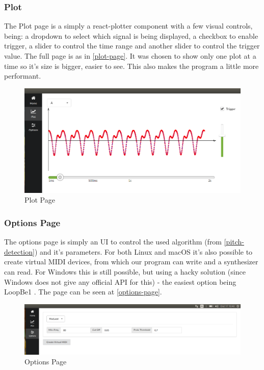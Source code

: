 \subsubsection{Plot}
The Plot page is a simply a react-plotter \cite{react-plotter} component with a few
visual controls, being: a dropdown to select which signal is being displayed,
a checkbox to enable trigger, a slider to control the time
range and another slider to control the trigger value. The full page is as in \autoref{plot-page}.
It was chosen to show only one plot at a time so it's size is bigger, easier to see.
This also makes the program a little more performant.
\begin{figure}[htb]
	\caption{Plot Page}
  \label{plot-page}
	\begin{center}
    \includegraphics[width=0.7\paperwidth]{images/snapshots/plot-trigger-A}
	\end{center}
\end{figure}

\subsubsection{Options Page}
The options page is simply an UI to control the used algorithm (from \autoref{pitch-detection})
and it's parameters. For both Linux and macOS it's also possible to create virtual
MIDI devices, from which our program can write and a synthesizer can read. For Windows
this is still possible, but using a hacky solution (since Windows does not give any
official API for this) - the easiest option being LoopBe1 \cite{LoopBe1}. The
page can be seen at \autoref{options-page}.
\begin{figure}[htb]
	\caption{Options Page}
	\label{options-page}
	\begin{center}
		\includegraphics[width=0.7\paperwidth]{images/snapshots/options}
	\end{center}
\end{figure}

